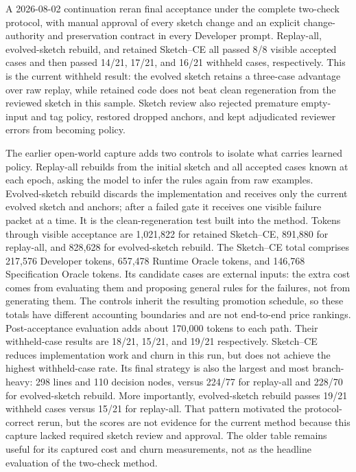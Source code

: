 \documentclass[11pt]{article}
\begin{document}
A 2026-08-02 continuation reran final acceptance under the complete two-check protocol, with
manual approval of every sketch change and an explicit change-authority and preservation contract
in every Developer prompt.  Replay-all, evolved-sketch rebuild, and retained Sketch--CE all passed
8/8 visible accepted cases and then passed 14/21, 17/21, and 16/21 withheld cases, respectively.
This is the current withheld result: the evolved sketch retains a three-case advantage over raw
replay, while retained code does not beat clean regeneration from the reviewed sketch in this
sample.  Sketch review also rejected premature empty-input and tag policy, restored dropped
anchors, and kept adjudicated reviewer errors from becoming policy.

The earlier open-world capture adds two controls to isolate what carries learned policy.  Replay-all rebuilds
from the initial sketch and all accepted cases known at each epoch, asking the model to infer the
rules again from raw examples.  Evolved-sketch rebuild discards the implementation and receives
only the current evolved sketch and anchors; after a failed gate it receives one visible failure
packet at a time.  It is the clean-regeneration test built into the method.  Tokens through
visible acceptance are 1,021,822 for retained
Sketch--CE, 891,880 for replay-all, and 828,628 for evolved-sketch rebuild.  The Sketch--CE total
comprises 217,576 Developer tokens, 657,478 Runtime Oracle tokens, and 146,768 Specification
Oracle tokens.  Its candidate cases are external inputs: the extra cost comes from evaluating
them and proposing general rules for the failures, not from generating them.  The controls
inherit the resulting promotion schedule, so these totals have different accounting boundaries
and are not end-to-end price rankings.  Post-acceptance evaluation adds about 170,000 tokens to
each path.  Their withheld-case results are 18/21, 15/21, and 19/21 respectively.  Sketch--CE reduces
implementation work and churn in this run, but does not achieve the highest withheld-case
rate.  Its final strategy is also the largest and most branch-heavy: 298 lines and 110 decision
nodes, versus 224/77 for replay-all and 228/70 for evolved-sketch rebuild.  More importantly,
evolved-sketch rebuild passes 19/21 withheld cases versus 15/21 for replay-all.  That pattern
motivated the protocol-correct rerun, but the scores are not evidence for the current method
because this capture lacked required sketch review and approval.  The older table remains useful
for its captured cost and churn measurements, not as the headline evaluation of the two-check
method.
\end{document}
